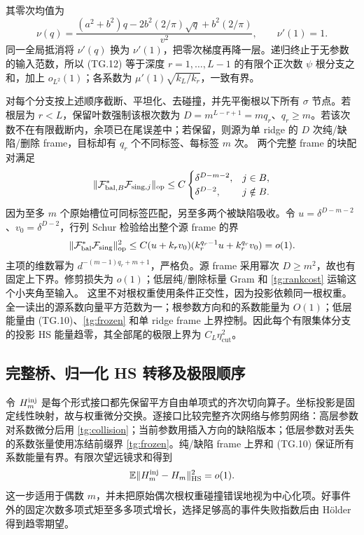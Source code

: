 \documentclass[a4paper]{tufte-handout}
\newcommand{\ecut}{\eta_{\mathrm{cut}}}
\begin{document}
\begin{fullwidth}
其零次均值为
\[
 \nu(q)=\frac{(a^2+b^2)q-2b^2(2/\pi)\sqrt q+b^2(2/\pi)}{v^2},\qquad \nu'(1)=1.
\]
同一全局抵消将 $\nu'(q)$ 换为 $\nu'(1)$，把零次梯度再降一层。递归终止于无参数的输入范数，所以 (TG.12) 等于深度 $r=1,\ldots,L-1$ 的有限个正次数 $\psi$ 根分支之和，加上 $o_{L^2}(1)$；各系数为 $\mu'(1)\sqrt{k_L/k_r}$，一致有界。

对每个分支按上述顺序截断、平坦化、去碰撞，并先平衡根以下所有 $\sigma$ 节点。若根层为 $r<L$，保留叶数强制该根次数为
$D=m^{L-r+1}=mq_r$、$q_r\ge m$。若该次数不在有限截断内，余项已在尾误差中；若保留，则源为单 ridge 的 $D$ 次纯/缺陷/删除 frame，目标却有 $q_r$ 个不同标签、每标签 $m$ 次。
两个完整 frame 的块配对满足
\[
 \|\mathcal F_{{\rm bal},B}^*\mathcal F_{{\rm sing},j}\|_{\rm op}
 \le C\begin{cases}\delta^{D-m-2},&j\in B,\\\delta^{D-2},&j\notin B.\end{cases}
\]
因为至多 $m$ 个原始槽位可同标签匹配，另至多两个被缺陷吸收。令 $u=\delta^{D-m-2}$、$v_0=\delta^{D-2}$，行列 Schur 检验给出整个源 frame 的界
\begin{equation}\label{tg:collective-angle}
 \|\mathcal F_{\rm bal}^*\mathcal F_{\rm sing}\|_{\rm op}^2
 \le C(u+k_rv_0)(k_r^{q_r-1}u+k_r^{q_r}v_0)=o(1).
\end{equation}
主项的维数幂为 $d^{-(m-1)q_r+m+1}$，严格负。源 frame 采用幂次 $D\ge m^2$，故也有固定上下界。修剪损失为 $o(1)$；低层纯/删除标量 Gram 和 \eqref{tg:rankcost} 运输这个小夹角至输入。
这里不对根权重使用条件正交性，因为投影依赖同一根权重。全一读出的源系数向量平方范数为一；根参数方向和的系数能量为 $O(1)$；低层能量由 (TG.10)、\eqref{tg:frozen} 和单 ridge frame 上界控制。因此每个有限集体分支的投影 HS 能量趋零，其全部尾的极限上界为 $C_L\ecut^2$。

\subsection{完整桥、归一化 HS 转移及极限顺序}
令 $H_m^{\rm inj}$ 是每个形式接口都先保留平方自由单项式的齐次切向算子。坐标投影是固定线性映射，故与权重微分交换。逐接口比较完整齐次网络与修剪网络：高层参数对系数微分后用 \eqref{tg:collision}；当前参数用插入方向的缺陷版本；低层参数对丢失的系数张量使用冻结前缀界 \eqref{tg:frozen}。纯/缺陷 frame 上界和 (TG.10) 保证所有系数能量有界。有限次望远镜求和得到
\begin{equation}\label{tg:homogeneous-trim}
 \mathbb E\|H_m^{\rm inj}-H_m\|_{\rm HS}^2=o(1).
\end{equation}
这一步适用于偶数 $m$，并未把原始偶次根权重碰撞错误地视为中心化项。好事件外的固定次数多项式矩至多多项式增长，选择足够高的事件失败指数后由 Hölder 得到趋零期望。


\end{fullwidth}
\end{document}
